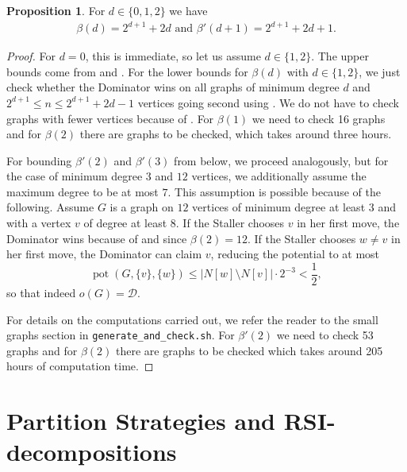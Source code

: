 \documentclass[a4paper,11pt,oneside]{scrartcl}
\theoremstyle{definition}
\newtheorem{proposition}[definition]{Proposition}
\theoremstyle{remark}
\DeclareMathOperator{\pot}{pot}
\begin{document}
\begin{proposition}\label{proposition:tiny_betas}
    For $d \in \{0, 1, 2\}$ we have 
    \begin{align*}
        \beta(d) = 2^{d+1} + 2d \text{ and } \beta'(d+1) = 2^{d+1} + 2d+1.
    \end{align*}
\end{proposition}
\begin{proof}
    For $d = 0$, this is immediate, so let us assume $d \in \{1,2\}$. 
    The upper bounds come from  and . For the lower bounds for $\beta(d)$ with $d \in \{1,2\}$, we just check whether the Dominator wins on all graphs of minimum degree $d$ and $2^{d+1} \leq n \leq 2^{d+1}+2d-1$ vertices going second using . We do not have to check graphs with fewer vertices because of . 
    For $\beta(1)$ we need to check 16 graphs and for $\beta(2)$ there are  graphs to be checked, which takes around three hours.
    
    For bounding $\beta'(2)$ and $\beta'(3)$ from below, we proceed analogously, but for the case of minimum degree $3$ and $12$ vertices, we additionally assume the maximum degree to be at most $7$. This assumption is possible because of the following. Assume $G$ is a graph on $12$ vertices of minimum degree at least $3$ and with a vertex $v$ of degree at least $8$. If the Staller chooses $v$ in her first move, the Dominator wins because of  and since $\beta(2) = 12$. If the Staller chooses $w \neq v$ in her first move, the Dominator can claim $v$, reducing the potential to at most
    \[
        \pot(G,\{v\},\{w\}) \leq |N[w] \setminus N[v]| \cdot 2^{-3} < \frac 12,
    \]
    so that indeed $o(G) = \mathcal D$.
    
    For details on the computations carried out, we refer the reader to the small graphs section in \texttt{generate\_and\_check.sh}. 
    For $\beta'(2)$ we need to check 53 graphs and for $\beta(2)$ there are  graphs to be checked which takes around 205 hours of computation time.
\end{proof}

\section{Partition Strategies and RSI-decompositions}\label{section:RSI_theory}
\end{document}

